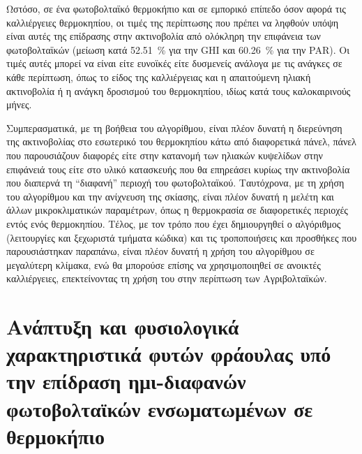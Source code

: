 \documentclass[12pt, a4paper]{report} %
\newcommand{\english}{\foreignlanguage{english}}
\begin{document}
Ωστόσο, σε ένα φωτοβολταϊκό θερμοκήπιο και σε εμπορικό επίπεδο όσον αφορά τις καλλιέργειες θερμοκηπίου, οι τιμές της 
περίπτωσης που πρέπει να ληφθούν υπόψη είναι αυτές της επίδρασης στην ακτινοβολία από ολόκληρη την επιφάνεια των φωτοβολταϊκών 
(μείωση κατά \SI{52,51}{\percent} για την \english{GHI} και \SI{60,26}{\percent} για την \english{PAR}). Οι τιμές αυτές μπορεί 
να είναι είτε ευνοϊκές είτε δυσμενείς ανάλογα με τις ανάγκες σε κάθε περίπτωση, όπως το είδος της καλλιέργειας και η απαιτούμενη 
ηλιακή ακτινοβολία ή η ανάγκη δροσισμού του θερμοκηπίου, ιδίως κατά τους καλοκαιρινούς μήνες.

Συμπερασματικά, με τη βοήθεια του αλγορίθμου, είναι πλέον δυνατή η διερεύνηση της ακτινοβολίας στο εσωτερικό του θερμοκηπίου 
κάτω από διαφορετικά πάνελ, πάνελ που παρουσιάζουν διαφορές είτε στην κατανομή των ηλιακών κυψελίδων στην επιφάνειά τους είτε 
στο υλικό κατασκευής που θα επηρεάσει κυρίως την ακτινοβολία που διαπερνά τη “διαφανή” περιοχή του φωτοβολταϊκού. Ταυτόχρονα, 
με τη χρήση του αλγορίθμου και την ανίχνευση της σκίασης, είναι πλέον δυνατή η μελέτη και άλλων μικροκλιματικών παραμέτρων, 
όπως η θερμοκρασία σε διαφορετικές περιοχές εντός ενός θερμοκηπίου. Τέλος, με τον τρόπο που έχει δημιουργηθεί ο αλγόριθμος 
(λειτουργίες και ξεχωριστά τμήματα κώδικα) και τις τροποποιήσεις και προσθήκες που παρουσιάστηκαν παραπάνω, είναι πλέον δυνατή 
η χρήση του αλγορίθμου σε μεγαλύτερη κλίμακα, ενώ θα μπορούσε επίσης να χρησιμοποιηθεί σε ανοικτές καλλιέργειες, επεκτείνοντας 
τη χρήση του στην περίπτωση των Αγριβολταϊκών.

\newpage
\vspace*{6.5cm}
\sloppy
\section{Ανάπτυξη και φυσιολογικά χαρακτηριστικά φυτών φράουλας υπό την επίδραση ημι-διαφανών φωτοβολταϊκών ενσωματωμένων σε θερμοκήπιο}
\label{sec_strawberries}
\fussy
\end{document}

